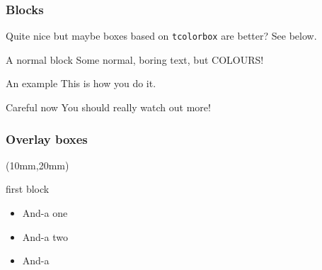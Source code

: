 \documentclass[mathserif, fleqn]{beamer}
\begin{document}
\begin{frame}\frametitle{Blocks}
  Quite nice but maybe boxes based on \texttt{tcolorbox} are better? See below.
  \begin{block}{A normal block}
    Some normal, boring text, but COLOURS!
  \end{block}
  \begin{exampleblock}{An example}
    This is how you do it.
  \end{exampleblock}
  \begin{alertblock}{Careful now}
    You should really watch out more!
  \end{alertblock}
\end{frame}

\begin{frame}\frametitle{Overlay boxes}
  \begin{textblock*}{60mm} (10mm,20mm)
    \begin{itembox}{first block}
      \begin{itemize}
      \item And-a one
      \item And-a two
      \item And-a
      \end{itemize}
    \end{itembox}
  \end{textblock*}


\end{frame}
\end{document}
